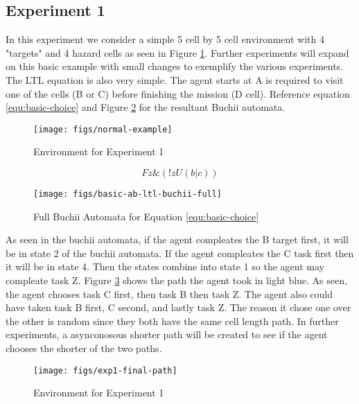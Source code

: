\documentclass[letter paper, 10 pt, conference]{ieeeconf}
\begin{document}
\subsection{Experiment 1}
In this experiment we consider a simple 5 cell by 5 cell environment with 4 "targets" and 4 hazard cells as seen in Figure \ref{fig:env1}. Further experiments will expand on this basic example with small changes to exemplify the various experiments. The LTL equation is also very simple. The agent starts at A is required to visit one of the cells (B or C) before finishing the mission (D cell). Reference equation \ref{equ:basic-choice} and Figure \ref{fig:buchii-basic-ab} for the resultant Buchii automata.

\begin{figure}[htb]
  \centering
  \texttt{[image: figs/normal-example]}
  \caption{Environment for Experiment 1}
  \label{fig:env1}
\end{figure}

\begin{equation}
  Fz \& (!z U (b | c))
  \label{equ:basic-choice}
\end{equation}

\begin{figure}[htb]
  \centering
  \texttt{[image: figs/basic-ab-ltl-buchii-full]}
  \caption{Full Buchii Automata for Equation \ref{equ:basic-choice}}
  \label{fig:buchii-basic-ab}
\end{figure}

As seen in the buchii automata, if the agent compleates the B target first, it will be in state 2 of the buchii automata. If the agent compleates the C task first then it will be in state 4. Then the states combine into state 1 so the agent may compleate task Z. Figure \ref{fig:exp1-final-path} shows the path the agent took in light blue. As seen, the agent chooses task C first, then task B then task Z. The agent also could have taken task B first, C second, and lastly task Z. The reason it chose one over the other is random since they both have the same cell length path. In further experiments, a asynconosous shorter path will be created to see if the agent chooses the shorter of the two paths.

\begin{figure}[htb]
  \centering
  \texttt{[image: figs/exp1-final-path]}
  \caption{Environment for Experiment 1}
  \label{fig:exp1-final-path}
\end{figure}
\end{document}
